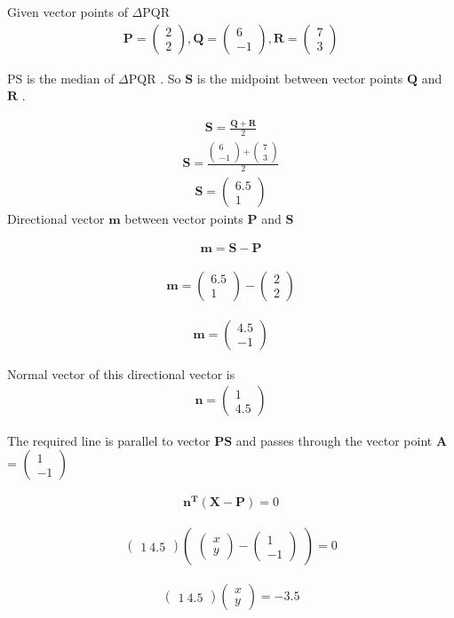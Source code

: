 \documentclass[journal,10pt,twocolumn]{article}
\let\vec\mathbf
\newcommand{\myvec}[1]{\ensuremath{\begin{pmatrix}#1\end{pmatrix}}}
\begin{document}
Given vector points of $\Delta$PQR 
\begin{eqnarray}
	\vec{P} = \myvec{2\\2},
	\vec{Q} = \myvec{6\\-1},
	\vec{R} = \myvec{7\\3}
\end{eqnarray}

PS is the median of $\Delta$PQR . So $\vec{S}$ is the midpoint between vector points $\vec{Q}$ and $\vec{R}$ .

\begin{eqnarray*}
	\vec{S}=\frac{\vec{Q}+\vec{R}}{2}	
    \end{eqnarray*}
\begin{eqnarray*}
	\vec{S}=\frac{\myvec{6\\-1}+\myvec{7\\3}}{2}
\end{eqnarray*}
\begin{eqnarray}
	\vec{S}=\myvec{6.5 \\1}
\end{eqnarray}
Directional vector $\vec{m}$  between vector points $\vec{P}$ and $\vec{S}$

\begin{eqnarray*}
	\vec{m}=\vec{S} - \vec{P}
\end{eqnarray*}

\begin{eqnarray*}
	\vec{m}=\myvec{6.5\\1} - \myvec{2 \\2}
\end{eqnarray*}


\begin{eqnarray}
	\vec{m}=\myvec{4.5\\-1}
\end{eqnarray}



Normal vector of this directional vector is
\begin{eqnarray}
\vec{n} = 	\myvec{1\\4.5}
\end{eqnarray}

The required line is parallel to vector $\vec{PS}$ and passes through the vector point $\vec{A}$ = $\myvec{1\\-1}$

\begin{eqnarray*}
\vec{n^T}\vec{(X-P)} = 0	
\end{eqnarray*}

\begin{eqnarray*}
	\myvec{1 \ 4.5}\myvec{\myvec{x\\y}-\myvec{1\\-1}}=0
\end{eqnarray*}

\begin{eqnarray}
        \myvec{1 \ 4.5}\myvec{x\\y}=-3.5
\end{eqnarray}
\end{document}
